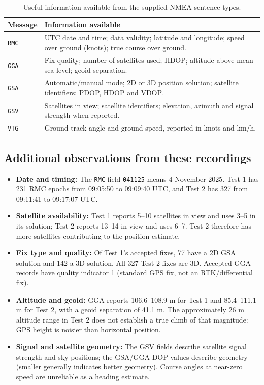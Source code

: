 \documentclass[11pt,a4paper]{article}
\begin{document}
\begin{table}[H]
\centering
\small
\caption{Useful information available from the supplied NMEA sentence types.}
\begin{tabularx}{\textwidth}{@{}lX@{}}
\toprule
Message & Information available \\
\midrule
\texttt{RMC} & UTC date and time; data validity; latitude and longitude; speed over ground (knots); true course over ground. \\
\texttt{GGA} & Fix quality; number of satellites used; HDOP; altitude above mean sea level; geoid separation. \\
\texttt{GSA} & Automatic/manual mode; 2D or 3D position solution; satellite identifiers; PDOP, HDOP and VDOP. \\
\texttt{GSV} & Satellites in view; satellite identifiers; elevation, azimuth and signal strength when reported. \\
\texttt{VTG} & Ground-track angle and ground speed, reported in knots and km/h. \\
\bottomrule
\end{tabularx}
\end{table}

\clearpage
\subsection{Additional observations from these recordings}

\begin{itemize}
  \item \textbf{Date and timing:} The \texttt{RMC} field \texttt{041125} means 4 November 2025. Test 1 has 231 RMC epochs from 09:05:50 to 09:09:40 UTC, and Test 2 has 327 from 09:11:41 to 09:17:07 UTC.
  \item \textbf{Satellite availability:} Test 1 reports 5--10 satellites in view and uses 3--5 in its solution; Test 2 reports 13--14 in view and uses 6--7. Test 2 therefore has more satellites contributing to the position estimate.
  \item \textbf{Fix type and quality:} Of Test 1's accepted fixes, 77 have a 2D GSA solution and 142 a 3D solution. All 327 Test 2 fixes are 3D. Accepted GGA records have quality indicator 1 (standard GPS fix, not an RTK/differential fix).
  \item \textbf{Altitude and geoid:} GGA reports 106.6--108.9 m for Test 1 and 85.4--111.1 m for Test 2, with a geoid separation of 41.1 m. The approximately 26 m altitude range in Test 2 does not establish a true climb of that magnitude: GPS height is noisier than horizontal position.
  \item \textbf{Signal and satellite geometry:} The GSV fields describe satellite signal strength and sky positions; the GSA/GGA DOP values describe geometry (smaller generally indicates better geometry). Course angles at near-zero speed are unreliable as a heading estimate.
\end{itemize}
\end{document}
